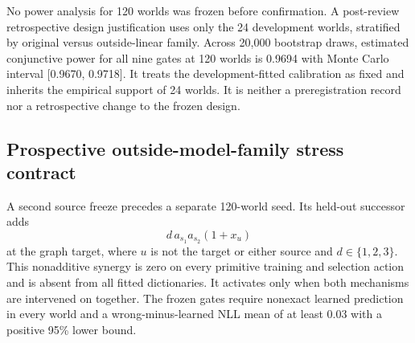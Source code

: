 No power analysis for 120 worlds was frozen before confirmation.  A
post-review retrospective design justification uses only the 24 development
worlds, stratified by original versus outside-linear family.  Across 20,000
bootstrap draws, estimated conjunctive power for all nine gates at 120 worlds is
0.9694 with Monte Carlo interval [0.9670, 0.9718].  It treats the
development-fitted calibration as fixed and inherits the empirical support of
24 worlds.  It is neither a preregistration record nor a retrospective change
to the frozen design.

\subsection{Prospective outside-model-family stress contract}

A second source freeze precedes a separate 120-world seed.  Its held-out
successor adds
\[
d\,a_{s_1}a_{s_2}(1+x_u)
\]
at the graph target, where \(u\) is not the target or either source and
\(d\in\{1,2,3\}\).  This nonadditive synergy is zero on every primitive training
and selection action and is absent from all fitted dictionaries.  It activates
only when both mechanisms are intervened on together.  The frozen gates require
nonexact learned prediction in every world and a wrong-minus-learned NLL mean of
at least 0.03 with a positive 95\% lower bound.
